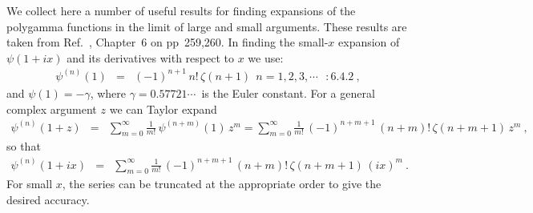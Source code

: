 \documentclass[preprint,12pt,eqsecnum,nofootinbib,amsmath,amssymb]{revtex4}
\begin{document}
We collect here a number of useful results for finding expansions 
of the polygamma functions in the limit of large and small 
arguments. These results are taken from Ref.~\cite{abst}, Chapter~6 
on pp~259,260. In finding the small-$x$ expansion of $\psi(1 + i x)$ 
and its derivatives with respect to $x$ we use:
\begin{eqnarray}
  \psi^{(n)}(1)&=&(-1)^{n+1}\, n!\,\zeta(n+1)
  ~~ n=1,2,3, \cdots   ~~~:6.4.2  ~ ,
\end{eqnarray}
and $\psi(1)=-\gamma$, where $\gamma=0.57721 \cdots\,$ is
the Euler constant. For a general complex argument $z$
we can Taylor expand 
\begin{eqnarray}
  \psi^{(n)}(1 + z) &=& \sum_{m=0}^\infty 
  \frac{1}{m!}\, \psi^{(n+m)}(1) \,  z^m =
  \sum_{m=0}^\infty 
  \frac{1}{m!}\, (-1)^{n+m+1}\, (n+m)!\,\zeta(n+m+1) 
  \,  z^m \ ,
\end{eqnarray}
so that 
\begin{eqnarray}
  \psi^{(n)}(1 + i x) &=& \sum_{m=0}^\infty 
  \frac{1}{m!}\, (-1)^{n+m+1}\, (n+m)!\,
  \zeta(n+m+1) \,  (i x)^m \ .
\end{eqnarray}
For small $x$, the series can be truncated at the 
appropriate order to give the desired accuracy.
\end{document}

